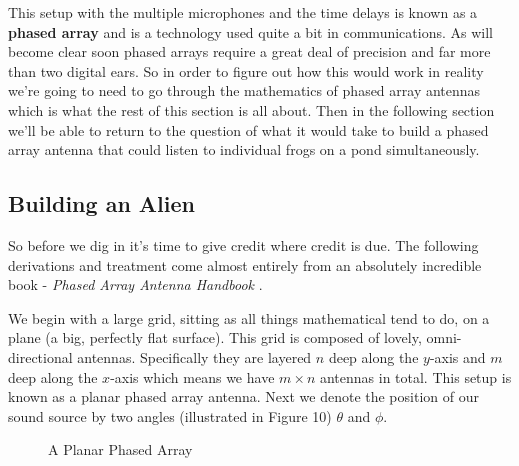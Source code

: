 \documentclass[10pt,a4paper]{article}
\begin{document}
This setup with the multiple microphones and the time delays is known as a \textbf{phased array} and is a technology used quite a bit in communications. As will become clear soon phased arrays require a great deal of precision and far more than two digital ears. So in order to figure out how this would work in reality we're going to need to go through the mathematics of phased array antennas which is what the rest of this section is all about. Then in the following section we'll be able to return to the question of what it would take to build a phased array antenna that could listen to individual frogs on a pond simultaneously. 
\subsection{Building an Alien}
So before we dig in it's time to give credit where credit is due. The following derivations and treatment come almost entirely from an absolutely incredible book - \textit{Phased Array Antenna Handbook} \cite{phasedhandbook}. 

We begin with a large grid, sitting as all things mathematical tend to do, on a plane (a big, perfectly flat surface). This grid is composed of lovely, omni-directional antennas. Specifically they are layered $n$ deep along the $y$-axis and $m$ deep along the $x$-axis which means we have $m\times n$ antennas in total. This setup is known as a planar phased array antenna. Next we denote the position of our sound source by two angles (illustrated in Figure 10) $\theta$ and $\phi$. 

\begin{figure}[!htb]
\caption{\label{fig:my-label} A Planar Phased Array}
\end{figure}
\end{document}
